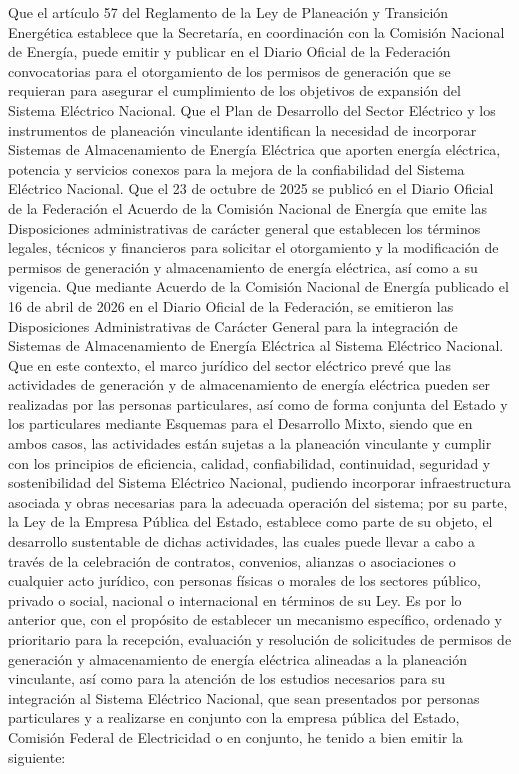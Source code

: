 Que el artículo 57 del Reglamento de la Ley de Planeación y Transición Energética establece que la Secretaría, en coordinación con la Comisión Nacional de Energía, puede emitir y publicar en el Diario Oficial de la Federación convocatorias para el otorgamiento de los permisos de generación que se requieran para asegurar el cumplimiento de los objetivos de expansión del Sistema Eléctrico Nacional.
Que el Plan de Desarrollo del Sector Eléctrico y los instrumentos de planeación vinculante identifican la necesidad de incorporar Sistemas de Almacenamiento de Energía Eléctrica que aporten energía eléctrica, potencia y servicios conexos para la mejora de la confiabilidad del Sistema Eléctrico Nacional.
Que el 23 de octubre de 2025 se publicó en el Diario Oficial de la Federación el Acuerdo de la Comisión Nacional de Energía que emite las Disposiciones administrativas de carácter general que establecen los términos legales, técnicos y financieros para solicitar el otorgamiento y la modificación de permisos de generación y almacenamiento de energía eléctrica, así como a su vigencia.
Que mediante Acuerdo de la Comisión Nacional de Energía publicado el 16 de abril de 2026 en el Diario Oficial de la Federación, se emitieron las Disposiciones Administrativas de Carácter General para la integración de Sistemas de Almacenamiento de Energía Eléctrica al Sistema Eléctrico Nacional.
Que en este contexto, el marco jurídico del sector eléctrico prevé que las actividades de generación y de almacenamiento de energía eléctrica pueden ser realizadas por las personas particulares, así como de forma conjunta del Estado y los particulares mediante Esquemas para el Desarrollo Mixto, siendo que en ambos casos, las actividades están sujetas a la planeación vinculante y cumplir con los principios de eficiencia, calidad, confiabilidad, continuidad, seguridad y sostenibilidad del Sistema Eléctrico Nacional, pudiendo incorporar infraestructura asociada y obras necesarias para la adecuada operación del sistema; por su parte, la Ley de la Empresa Pública del Estado, establece como parte de su objeto, el desarrollo sustentable de dichas actividades, las cuales puede llevar a cabo a través de la celebración de contratos, convenios, alianzas o asociaciones o cualquier acto jurídico, con personas físicas o morales de los sectores público, privado o social, nacional o internacional en términos de su Ley.
Es por lo anterior que, con el propósito de establecer un mecanismo específico, ordenado y prioritario para la recepción, evaluación y resolución de solicitudes de permisos de generación y almacenamiento de energía eléctrica alineadas a la planeación vinculante, así como para la atención de los estudios necesarios para su integración al Sistema Eléctrico Nacional, que sean presentados por personas particulares y a realizarse en conjunto con la empresa pública del Estado, Comisión Federal de Electricidad o en conjunto, he tenido a bien emitir la siguiente:
